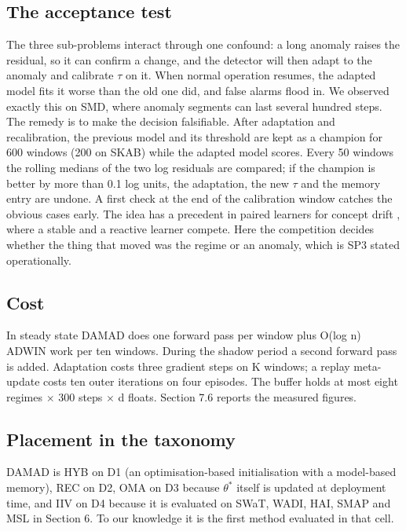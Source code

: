 \hypertarget{the-acceptance-test}{%
\subsection{The acceptance test}\label{the-acceptance-test}}

The three sub-problems interact through one confound: a long anomaly raises the residual, so it can confirm a change, and the detector will then adapt to the anomaly and calibrate \(\tau\) on it. When normal operation resumes, the adapted model fits it worse than the old one did, and false alarms flood in. We observed exactly this on SMD, where anomaly segments can last several hundred steps. The remedy is to make the decision falsifiable. After adaptation and recalibration, the previous model and its threshold are kept as a champion for 600 windows (200 on SKAB) while the adapted model scores. Every 50 windows the rolling medians of the two log residuals are compared; if the champion is better by more than 0.1 log units, the adaptation, the new \(\tau\) and the memory entry are undone. A first check at the end of the calibration window catches the obvious cases early. The idea has a precedent in paired learners for concept drift \citep{bach2008paired}, where a stable and a reactive learner compete. Here the competition decides whether the thing that moved was the regime or an anomaly, which is SP3 stated operationally.

\hypertarget{cost}{%
\subsection{Cost}\label{cost}}

In steady state DAMAD does one forward pass per window plus O(log n) ADWIN work per ten windows. During the shadow period a second forward pass is added. Adaptation costs three gradient steps on K windows; a replay meta-update costs ten outer iterations on four episodes. The buffer holds at most eight regimes \ensuremath{\times} 300 steps \ensuremath{\times} d floats. Section 7.6 reports the measured figures.

\hypertarget{placement-in-the-taxonomy}{%
\subsection{Placement in the taxonomy}\label{placement-in-the-taxonomy}}

DAMAD is HYB on D1 (an optimisation-based initialisation with a model-based memory), REC on D2, OMA on D3 because \(\theta^*\) itself is updated at deployment time, and IIV on D4 because it is evaluated on SWaT, WADI, HAI, SMAP and MSL in Section 6. To our knowledge it is the first method evaluated in that cell.

